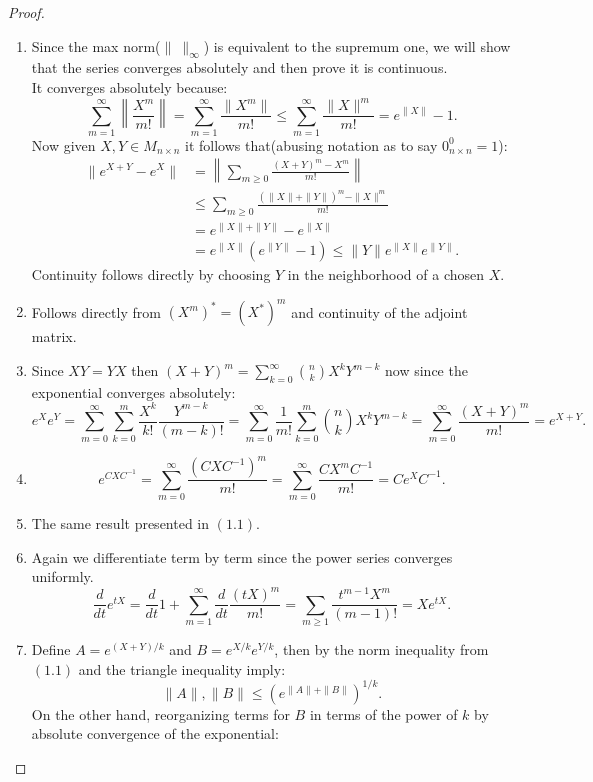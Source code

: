 \begin{proof}
	\begin{enumerate}[label=(\alph*)]
		\item Since the max norm($\|\ \|_\infty$) is equivalent to the supremum one, we will show that the series converges absolutely and then prove it is continuous.\\
		It converges absolutely because:
		\begin{equation}
			\sum_{m=1}^\infty \left\|\frac{X^m}{m!}\right\| = \sum_{m=1}^\infty \frac{\|X^m\|}{m!} \le \sum_{m=1}^\infty \frac{\|X\|^m}{m!} = e^{\|X\|}-1.	
		\end{equation}
		Now given $X,Y \in M_{n\times n}$ it follows that(abusing notation as to say $0_{n\times n}^0=1$):
		\begin{align*}
		\|e^{X+Y}-e^X\| &=\left\|\sum_{m\ge 0}\frac{(X+Y)^m - X^m}{m!}\right\|\\
		&\le \sum_{m\ge 0} \frac{(\|X\|+\|Y\|)^m - \|X\|^m}{m!}\\
		&= e^{\|X\|+\|Y\|}-e^{\|X\|}\\
		&= e^{\|X\|} (e^{\|Y\|}-1) \le \|Y\|e^{\|X\|}e^{\|Y\|}.
		\end{align*}
		Continuity follows directly by choosing $Y$ in the neighborhood of a chosen $X$.
		\item Follows directly from $(X^m)^*=(X^*)^m$ and continuity of the adjoint matrix.
		\item Since $XY=YX$ then $(X+Y)^m=\sum_{k=0}^\infty {n\choose k}X^kY^{m-k}$ now since the exponential converges absolutely:
		$$e^Xe^Y = \sum_{m=0}^\infty\sum_{k=0}^m \frac{X^k}{k!}\frac{Y^{m-k}}{(m-k)!}=\sum_{m=0}^\infty \frac{1}{m!}\sum_{k=0}^m{n\choose k}X^kY^{m-k} = \sum_{m=0}^\infty \frac{(X+Y)^m}{m!} = e^{X+Y}.$$
		\item 
		$$e^{CXC^{-1}} = \sum_{m=0}^\infty \frac{(CXC^{-1})^m}{m!} = \sum_{m=0}^\infty \frac{CX^mC^{-1}}{m!} = C e^X C^{-1}.$$
		\item The same result presented in $(1.1)$.
		\item Again we differentiate term by term since the power series converges uniformly.
		$$\frac{d}{dt} e^{tX} = \frac{d}{dt}1+\sum_{m=1}^\infty \frac{d}{dt}\frac{(tX)^m}{m!} = \sum_{m\ge 1} \frac{t^{m-1}X^m}{(m-1)!} = Xe^{tX}.  $$
		\item Define $A= e^{(X+Y)/k}$ and $B=e^{X/k}e^{Y/k}$, then by the norm inequality from $(1.1)$ and the triangle inequality imply:
		$$\|A\|,\|B\|\le (e^{\|A\|+\|B\|})^{1/k}.$$
		On the other hand, reorganizing terms for $B$ in terms of the power of $k$ by absolute convergence of the exponential:

\end{enumerate}
\end{proof}
